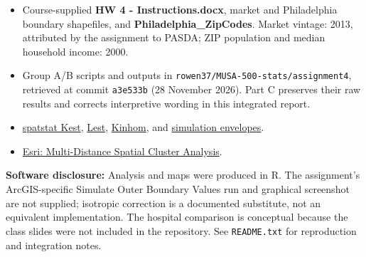 \documentclass[
  10pt,
]{article}
\providecommand{\tightlist}{%
  \setlength{\itemsep}{0pt}\setlength{\parskip}{0pt}}
\begin{document}
\begin{itemize}
\tightlist
\item
  Course-supplied \textbf{HW 4 - Instructions.docx}, market and
  Philadelphia boundary shapefiles, and \textbf{Philadelphia\_ZipCodes}.
  Market vintage: 2013, attributed by the assignment to PASDA; ZIP
  population and median household income: 2000.
\item
  Group A/B scripts and outputs in
  \texttt{rowen37/MUSA-500-stats/assignment4}, retrieved at commit
  \texttt{a3e533b} (28 November 2026). Part C preserves their raw
  results and corrects interpretive wording in this integrated report.
\item
  \href{https://search.r-project.org/CRAN/refmans/spatstat.explore/html/Kest.html}{spatstat
  Kest},
  \href{https://search.r-project.org/CRAN/refmans/spatstat.explore/html/Lest.html}{Lest},
  \href{https://search.r-project.org/CRAN/refmans/spatstat.explore/html/Kinhom.html}{Kinhom},
  and
  \href{https://search.r-project.org/CRAN/refmans/spatstat.explore/html/envelope.html}{simulation
  envelopes}.
\item
  \href{https://pro.arcgis.com/en/pro-app/3.4/tool-reference/spatial-statistics/multi-distance-spatial-cluster-analysis.htm}{Esri:
  Multi-Distance Spatial Cluster Analysis}.
\end{itemize}

\textbf{Software disclosure:} Analysis and maps were produced in R. The
assignment's ArcGIS-specific Simulate Outer Boundary Values run and
graphical screenshot are not supplied; isotropic correction is a
documented substitute, not an equivalent implementation. The hospital
comparison is conceptual because the class slides were not included in
the repository. See \texttt{README.txt} for reproduction and integration
notes.
\end{document}
